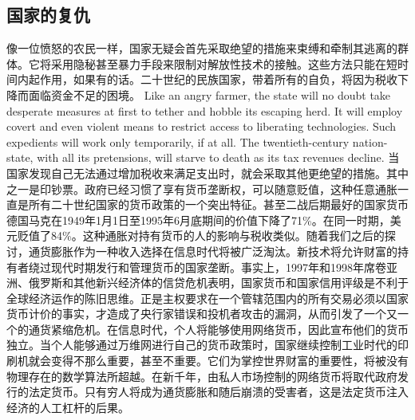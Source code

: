 \subsection{国家的复仇}
\begin{paracol}{2}[]
像一位愤怒的农民一样，国家无疑会首先采取绝望的措施来束缚和牵制其逃离的群体。它将采用隐秘甚至暴力手段来限制对解放性技术的接触。这些方法只能在短时间内起作用，如果有的话。二十世纪的民族国家，带着所有的自负，将因为税收下降而面临资金不足的困境。
\switchcolumn
Like an angry farmer, the state will no doubt take desperate measures at first to tether and hobble its escaping herd. It will employ covert and even violent means to restrict access to liberating technologies. Such expedients will work only temporarily, if at all. The twentieth-century nation-state, with all its pretensions, will starve to death as its tax revenues decline.
\switchcolumn*
当国家发现自己无法通过增加税收来满足支出时，就会采取其他更绝望的措施。其中之一是印钞票。政府已经习惯了享有货币垄断权，可以随意贬值，这种任意通胀一直是所有二十世纪国家的货币政策的一个突出特征。甚至二战后期最好的国家货币德国马克在1949年1月1日至1995年6月底期间的价值下降了71\%。在同一时期，美元贬值了84\%。这种通胀对持有货币的人的影响与税收类似。随着我们之后的探讨，通货膨胀作为一种收入选择在信息时代将被广泛淘汰。新技术将允许财富的持有者绕过现代时期发行和管理货币的国家垄断。事实上，1997年和1998年席卷亚洲、俄罗斯和其他新兴经济体的信贷危机表明，国家货币和国家信用评级是不利于全球经济运作的陈旧思维。正是主权要求在一个管辖范围内的所有交易必须以国家货币计价的事实，才造成了央行家错误和投机者攻击的漏洞，从而引发了一个又一个的通货紧缩危机。在信息时代，个人将能够使用网络货币，因此宣布他们的货币独立。当个人能够通过万维网进行自己的货币政策时，国家继续控制工业时代的印刷机就会变得不那么重要，甚至不重要。它们为掌控世界财富的重要性，将被没有物理存在的数学算法所超越。在新千年，由私人市场控制的网络货币将取代政府发行的法定货币。只有穷人将成为通货膨胀和随后崩溃的受害者，这是法定货币注入经济的人工杠杆的后果。
\switchcolumn

\end{paracol}
